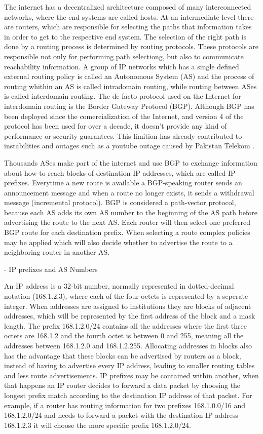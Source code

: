 \documentclass[11pt]{report}
\begin{document}
The internet has a decentralized architecture composed of many interconnected networks, where the end systems are called hosts. At an intermediate level there are routers, which are responsible for selecting the paths that information takes in order to get to the respective end system. The selection of the right path is done by a routing process is determined by routing protocols. These protocols are responsible not only for performing path selectiong, but also to communicate reachability information. A group of IP networks which has a single defined external routing policy is called an Autonomous System (AS) and the process of routing whithin an AS is called intradomain routing, while routing between ASes is called interdomain routing. The de facto protocol used on the Internet for interdomain routing is the Border Gateway Protocol (BGP).
Although BGP has been deployed since the comercialization of the Internet, and version 4 of the protocol has been used for over a decade, it doesn't provide any kind of performance or security guarantees. This limition has already contributed to instabilities and outages \cite{Misdirection} such as a youtube outage caused by Pakistan Telekom \cite{Pakistan}. 

	Thousands ASes make part of the internet and use BGP to exchange information about how to reach blocks of destination IP addresses, which are called IP prefixes. Everytime a new route is available a BGP-speaking router sends an announcement message and when a route no longer exists, it sends a withdrawal message (incremental protocol). BGP is considered a path-vector protocol, because each AS adds its own AS number to the beginning of the AS path before advertising the route to the next AS. Each router will then select one preferred BGP route for each destination prefix. When selecting a route complex policies may be applied which will also decide whether to advertise the route to a neighboring router in another AS.   

	- IP prefixes and AS Numbers
	
	An IP address is a 32-bit number, normally represented in dotted-decimal notation (168.1.2.3), where each of the four octets is represented by a seperate integer. When addresses are assigned to institutions they are blocks of adjacent addresses, which will be represented by the first address of the block and a mask length. The prefix 168.1.2.0/24 contains all the addresses where the first three octets are 168.1.2 and the fourth octet is between 0 and 255, meaning all the addresses between 168.1.2.0 and 168.1.2.255. Allocating addresses in blocks also has the advantage that these blocks can be advertised by routers as a block, instead of having to advertise every IP address, leading to smaller routing tables and less route advertisements. IP prefixes may be contained within another, when that happens an IP router decides to forward a data packet by choosing the longest prefix match according to the destination IP address of that packet. For example, if a router has routing information for two prefixes 168.1.0.0/16 and 168.1.2.0/24 and needs to forward a packet with the destination IP address 168.1.2.3 it will choose the more specific prefix 168.1.2.0/24. 
\end{document}
